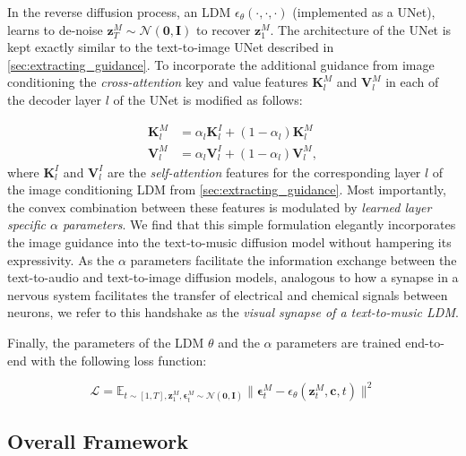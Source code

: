 In the reverse diffusion process, an LDM  $\epsilon_\theta(\cdot,\cdot,\cdot)$ (implemented as a UNet), learns to de-noise $\bm{z}_T^M \sim \mathcal{N}(\boldsymbol{0}, \textbf{I})$ to recover $\bm{z}_1^M$. The architecture of the UNet is kept exactly similar to the text-to-image UNet described in \cref{sec:extracting_guidance}. To incorporate the additional guidance from image conditioning the \textit{cross-attention} key and value features $\bm{K}_l^{M}$ and $\bm{V}_l^{M}$ in each of the decoder layer $l$ of the UNet is modified as follows:

\vspace{-0.18in}

\begin{align} 
\bm{K}^M_l &=  \alpha_l \bm{K}^I_l + (1 - \alpha_l) \bm{K}^M_l \\ 
\bm{V}^M_l &=  \alpha_l \bm{V}^I_l + (1 - \alpha_l) \bm{V}^M_l\label{eqn:synapse},
\end{align}
where $\bm{K}^I_l$ and $\bm{V}^I_l$ are the \textit{self-attention} features for the corresponding layer $l$ of the image conditioning LDM from \cref{sec:extracting_guidance}. Most importantly, the convex combination between these features is modulated by \textit{learned layer specific $\alpha$ parameters}. We find that this simple formulation elegantly incorporates the image guidance into the text-to-music diffusion model without hampering its expressivity. As the $\alpha$ parameters facilitate the information exchange between the text-to-audio and text-to-image diffusion models, analogous to how a synapse in a nervous system facilitates the transfer of electrical and chemical signals between neurons, we refer to this handshake as the \textit{visual synapse of a text-to-music LDM}. 

Finally, the parameters of the LDM $\theta$ and the $\alpha$ parameters are trained end-to-end with the following loss function: 

\vspace{-0.17in}

\begin{equation}
    \mathcal{L} = \mathbb{E}_{t\sim[1,T], \bm{z}_1^M, \bm{\epsilon}^M_t \sim \mathcal{N}(\boldsymbol{0}, \textbf{I})}\lVert \bm{\epsilon}^M_t - \epsilon_\theta(\bm{z}_t^M, \bm{c}, t) \rVert^2
    \label{eqn:loss}
\end{equation} 

\subsection{Overall Framework}

